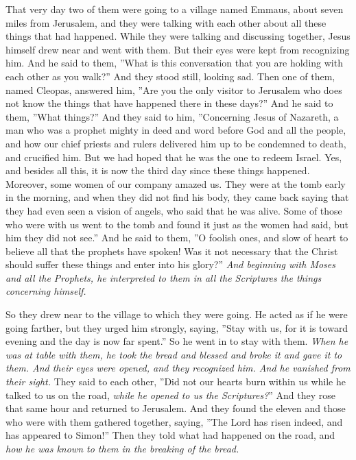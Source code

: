 \documentclass[
]{article}
\newcommand{\RL}[1]{\beginR #1\endR}
\begin{document}
That very day two of them were going to a village named Emmaus, about
seven miles from Jerusalem, and they were talking with each other about
all these things that had happened. While they were talking and
discussing together, Jesus himself drew near and went with them. But
their eyes were kept from recognizing him. And he said to them,
\RL{''}What is this conversation that you are holding with each other as
you walk?'' And they stood still, looking sad. Then one of them, named
Cleopas, answered him, \RL{''}Are you the only visitor to Jerusalem who
does not know the things that have happened there in these days?'' And
he said to them, \RL{''}What things?'' And they said to him,
\RL{''}Concerning Jesus of Nazareth, a man who was a prophet mighty in
deed and word before God and all the people, and how our chief priests
and rulers delivered him up to be condemned to death, and crucified him.
But we had hoped that he was the one to redeem Israel. Yes, and besides
all this, it is now the third day since these things happened. Moreover,
some women of our company amazed us. They were at the tomb early in the
morning, and when they did not find his body, they came back saying that
they had even seen a vision of angels, who said that he was alive. Some
of those who were with us went to the tomb and found it just as the
women had said, but him they did not see.'' And he said to them,
\RL{''}O foolish ones, and slow of heart to believe all that the
prophets have spoken! Was it not necessary that the Christ should suffer
these things and enter into his glory?'' \emph{And beginning with Moses
and all the Prophets, he interpreted to them in all the Scriptures the
things concerning himself.}

So they drew near to the village to which they were going. He acted as
if he were going farther, but they urged him strongly, saying,
\RL{''}Stay with us, for it is toward evening and the day is now far
spent.'' So he went in to stay with them. \emph{When he was at table
with them, he took the bread and blessed and broke it and gave it to
them. And their eyes were opened, and they recognized him. And he
vanished from their sight.} They said to each other, \RL{''}Did not our
hearts burn within us while he talked to us on the road, \emph{while he
opened to us the Scriptures?}'' And they rose that same hour and
returned to Jerusalem. And they found the eleven and those who were with
them gathered together, saying, \RL{''}The Lord has risen indeed, and
has appeared to Simon!'' Then they told what had happened on the road,
and \emph{how he was known to them in the breaking of the bread.}
\end{document}
